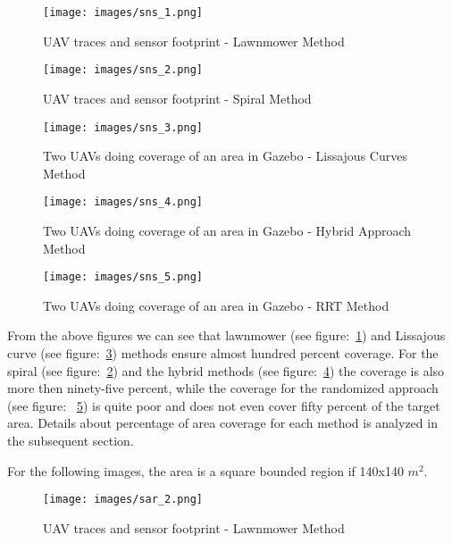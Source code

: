 \begin{figure}[htbp]

  \texttt{[image: images/sns\_1.png]}
  \caption{UAV traces and sensor footprint - Lawnmower Method}\label{fig:sfl111} 

\end{figure}

\begin{figure}[htbp]
  \texttt{[image: images/sns\_2.png]}
  \caption{UAV traces and sensor footprint - Spiral Method}\label{fig:sfs1231}
\end{figure}

\begin{figure}[htbp]
  \texttt{[image: images/sns\_3.png]}
  \caption{Two UAVs doing coverage of an area in Gazebo - Lissajous Curves Method}\label{fig:sflc1212} 
\end{figure}

\begin{figure}[htbp]
  \texttt{[image: images/sns\_4.png]}
  \caption{Two UAVs doing coverage of an area in Gazebo - Hybrid Approach Method}\label{fig:sfsl2112} \end{figure}

\begin{figure}[htbp]
  \texttt{[image: images/sns\_5.png]}
  \caption{Two UAVs doing coverage of an area in Gazebo - RRT Method}\label{fig:sfrrt167}
\end{figure}

From the above figures we can see that lawnmower (see figure:~\ref{fig:sfl111}) and Lissajous curve  (see figure:~\ref{fig:sflc1212}) methods ensure almost hundred percent coverage. For the spiral (see figure:~\ref{fig:sfs1231})  and the hybrid methods (see figure:~\ref{fig:sfsl2112}) the coverage is also more then ninety-five percent, while the coverage for the randomized approach (see figure: ~\ref{fig:sfrrt167}) is quite poor and does not even cover fifty percent of the target area. Details about percentage of area coverage for each method is analyzed in the subsequent section. 

\newpage

For the following images, the area is a square bounded region if 140x140 $m^{2}$.
\begin{figure}[htbp]

  \texttt{[image: images/sar\_2.png]}
  \caption{UAV traces and sensor footprint - Lawnmower Method}\label{fig:sfl1099}

\end{figure}


